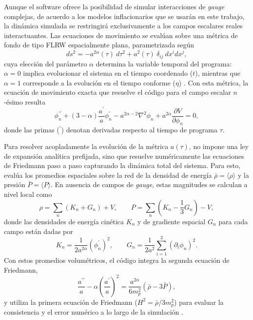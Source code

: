 Aunque el software ofrece la posibilidad de simular interacciones de \textit{gauge} complejas, de acuerdo a los modelos inflacionarios que se usarán en este trabajo, la dinámica simulada se restringirá exclusivamente a los campos escalares reales interactuantes. Las ecuaciones de movimiento se evalúan sobre una métrica de fondo de tipo FLRW espacialmente plana, parametrizada según
\begin{equation}
    ds^2 = - a^{2 \alpha} (\tau) ~ d\tau^2 + a^2 (\tau) ~ \delta_{ij} ~ dx^i dx^j,
\end{equation}
cuya elección del parámetro $\alpha$ determina la variable temporal del programa: $\alpha = 0$ implica evolucionar el sistema en el tiempo coordenado ($t$), mientras que $\alpha = 1$ corresponde a la evolución en el tiempo conforme ($\eta$) \cite{Figueroa2023}. Con esta métrica, la ecuación de movimiento exacta que resuelve el código para el campo escalar $n$-ésimo resulta
\begin{equation}\label{eqn:eom_lattice}
    \phi_n^{\prime \prime} + (3 - \alpha) \frac{a^\prime}{a} \phi_n^\prime - a^{2\alpha - 2} \nabla^2 \phi_n + a^{2\alpha} \frac{\partial V}{\partial \phi_n} = 0,
\end{equation}
donde las primas ($^\prime$) denotan derivadas respecto al tiempo de programa $\tau$. 

Para resolver acopladamente la evolución de la métrica $a(\tau)$, \CosmoLattice no impone una ley de expansión analítica prefijada, sino que resuelve numéricamente las ecuaciones de Friedmann paso a paso capturando la dinámica total del sistema. Para esto, evalúa los promedios espaciales sobre la red de la densidad de energía $\bar{\rho} = \langle \rho \rangle$ y la presión $\bar{P} = \langle P \rangle$. En ausencia de campos de \textit{gauge}, estas magnitudes se calculan a nivel local como
\begin{equation}
    \rho = \sum_n \left( K_n + G_n \right) + V, \quad \quad P = \sum_n \left( K_n - \frac{1}{3} G_n \right) - V,
\end{equation}
donde las densidades de energía cinética $K_n$ y de gradiente espacial $G_n$ para cada campo están dadas por
\begin{equation}\label{eqn:CosmoLattice_energies}
    K_n = \frac{1}{2 a^{2 \alpha}} \left( \phi_n^\prime \right)^2, \quad \quad G_n = \frac{1}{2 a^2} \sum_{i=1}^3 \left( \partial_i \phi_n \right)^2.
\end{equation}
Con estos promedios volumétricos, el código integra la segunda ecuación de Friedmann,
\begin{equation}
    \frac{a^{\prime \prime}}{a} - \alpha \left( \frac{a^\prime}{a} \right)^2 = \frac{a^{2\alpha}}{6 m_p^2} \left( \bar{\rho} - 3 \bar{P} \right),
\end{equation}
y utiliza la primera ecuación de Friedmann ($H^2 = \bar{\rho} / 3 m_p^2$) para evaluar la consistencia y el error numérico a lo largo de la simulación \cite{Figueroa2021}.

